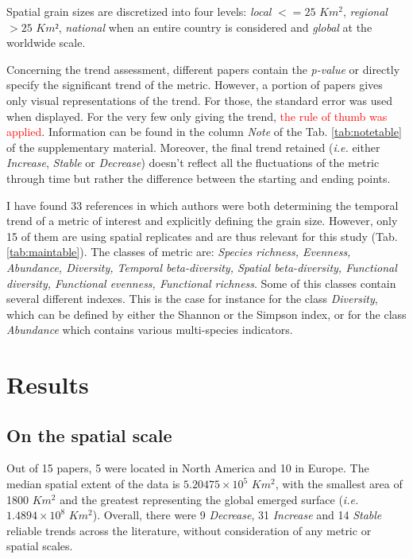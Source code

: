 \documentclass[
  12pt,
  oneside]{report}
\begin{document}
Spatial grain sizes are discretized into four levels: \emph{local} \(<= 25\) \(Km^2\), \emph{regional} \(> 25\) \(Km²\), \emph{national} when an entire country is considered and \emph{global} at the worldwide scale.

Concerning the trend assessment, different papers contain the \emph{p-value} or directly specify the significant trend of the metric. However, a portion of papers gives only visual representations of the trend. For those, the standard error was used when displayed. For the very few only giving the trend, \textcolor{red}{the rule of thumb was applied}. Information can be found in the column \emph{Note} of the Tab. \ref{tab:notetable} of the supplementary material. Moreover, the final trend retained (\emph{i.e.} either \emph{Increase}, \emph{Stable} or \emph{Decrease}) doesn't reflect all the fluctuations of the metric through time but rather the difference between the starting and ending points.

I have found 33 references in which authors were both determining the temporal trend of a metric of interest and explicitly defining the grain size. However, only 15 of them are using spatial replicates and are thus relevant for this study (Tab. \ref{tab:maintable}). The classes of metric are: \emph{Species richness, Evenness, Abundance, Diversity, Temporal beta-diversity, Spatial beta-diversity, Functional diversity, Functional evenness, Functional richness}. Some of this classes contain several different indexes. This is the case for instance for the class \emph{Diversity}, which can be defined by either the Shannon or the Simpson index, or for the class \emph{Abundance} which contains various multi-species indicators.

\hypertarget{results}{%
\chapter{Results}\label{results}}

\hypertarget{on-the-spatial-scale}{%
\section{On the spatial scale}\label{on-the-spatial-scale}}

Out of 15 papers, 5 were located in North America and 10 in Europe. The median spatial extent of the data is \ensuremath{5.20475\times 10^{5}} \(Km^2\), with the smallest area of 1800 \(Km^2\) and the greatest representing the global emerged surface (\emph{i.e.} \ensuremath{1.4894\times 10^{8}} \(Km^2\)). Overall, there were 9 \emph{Decrease}, 31 \emph{Increase} and 14 \emph{Stable} reliable trends across the literature, without consideration of any metric or spatial scales.
\end{document}
